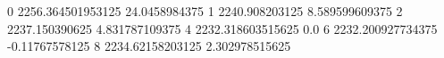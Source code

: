 0 2256.364501953125 24.0458984375
1 2240.908203125 8.589599609375
2 2237.150390625 4.831787109375
4 2232.318603515625 0.0
6 2232.200927734375 -0.11767578125
8 2234.62158203125 2.302978515625

